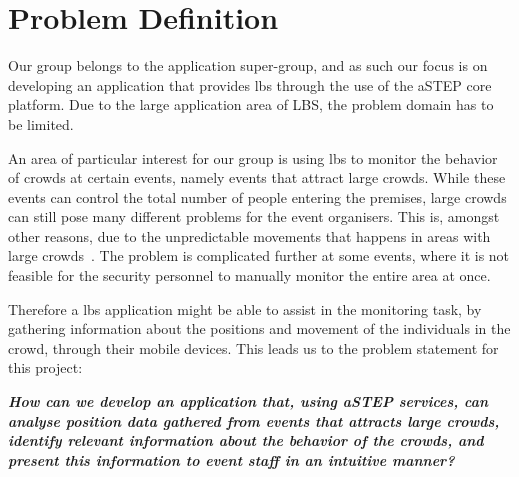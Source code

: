 \section{Problem Definition} \label{sec:problem_def}
Our group belongs to the application super-group, and as such our focus is on developing an application that provides \gls{lbs} through the use of the aSTEP core platform. Due to the large application area of LBS, the problem domain has to be limited. 

An area of particular interest for our group is using \gls{lbs} to monitor the behavior of crowds at certain events, namely events that attract large crowds. While these events can control the total number of people entering the premises, large crowds can still pose many different problems for the event organisers. This is, amongst other reasons, due to the unpredictable movements that happens in areas with large crowds~\cite{wirz2012inferring}. The problem is complicated further at some events, where it is not feasible for the security personnel to manually monitor the entire area at once. 

Therefore a \gls{lbs} application might be able to assist in the monitoring task, by gathering information about the positions and movement of the individuals in the crowd, through their mobile devices. This leads us to the problem statement for this project:

\vspace{0.5 cm}
\begin{center}
	\textbf{\textit{How can we develop an application that, using aSTEP services, can analyse position data gathered from events that attracts large crowds, identify relevant information about the behavior of the crowds, and present this information to event staff in an intuitive manner?}}
\end{center}